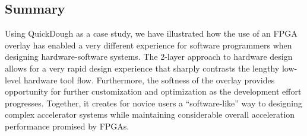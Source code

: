\subsection{Summary}
Using QuickDough as a case study, we have illustrated how the use of an FPGA overlay has enabled a very different experience for software programmers when designing hardware-software systems.
The 2-layer approach to hardware design allows for a very rapid design experience that sharply contrasts the lengthy low-level hardware tool flow.
Furthermore, the softness of the overlay provides opportunity for further customization and optimization as the development effort progresses.
Together, it creates for novice users a ``software-like'' way to designing complex accelerator systems while maintaining considerable overall acceleration performance promised by FPGAs.




